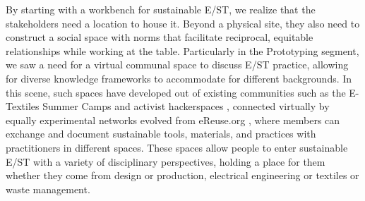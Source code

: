 \documentclass[manuscript,review,anonymous]{acmart}
\begin{document}
By starting with a workbench for sustainable E/ST, we realize that the stakeholders need a location to house it. Beyond a physical site, they also need to construct a social space with norms that facilitate reciprocal, equitable relationships while working at the table.
Particularly in the Prototyping segment, we saw a need for a virtual communal space to discuss E/ST practice, allowing for diverse knowledge frameworks to accommodate for different backgrounds. In this scene, such spaces have developed out of existing communities such as the E-Textiles Summer Camps \cite{noauthor_httpetextile-summercamporg_nodate} and activist hackerspaces \cite{renno_activism_nodate}, connected virtually by equally experimental networks evolved from eReuse.org \cite{franquesa_circular_2016}, where members can exchange and document sustainable tools, materials, and practices with practitioners in different spaces.
These spaces allow people to enter sustainable E/ST with a variety of disciplinary perspectives, holding a place for them whether they come from design or production, electrical engineering or textiles or waste management. 
\end{document}
